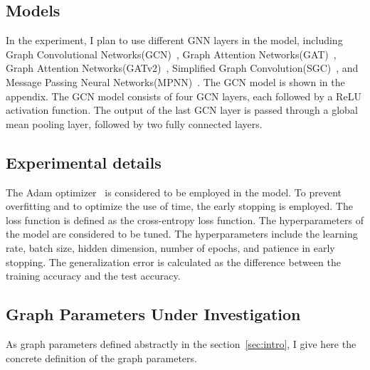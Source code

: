 \documentclass{article}
\begin{document}
\subsection{Models}
In the experiment, I plan to use different GNN layers in the model, including Graph Convolutional Networks(GCN)~\cite{kipf2016semi}, Graph Attention Networks(GAT)~\cite{velickovic2020pointer}, Graph Attention Networks(GATv2)~\cite{brody2021attentive}, Simplified Graph Convolution(SGC)~\cite{wu2019simplifying}, and Message Passing Neural Networks(MPNN)~\cite{gilmer2017neural}. The GCN model is shown in the appendix. The GCN model consists of four GCN layers, each followed by a ReLU activation function. The output of the last GCN layer is passed through a global mean pooling layer, followed by two fully connected layers.

\subsection{Experimental details}
The Adam optimizer~\cite{kingma2014adam} is considered to be employed in the model. To prevent overfitting and to optimize the use of time, the early stopping is employed. The loss function is defined as the cross-entropy loss function. The hyperparameters of the model are considered to be tuned. The hyperparameters include the learning rate, batch size, hidden dimension, number of epochs, and patience in early stopping. The generalization error is calculated as the difference between the training accuracy and the test accuracy.

\subsection{Graph Parameters Under Investigation} \label{sec:graph_parameters}
As graph parameters defined abstractly in the section~\ref{sec:intro}, I give here the concrete definition of the graph parameters.
\end{document}
